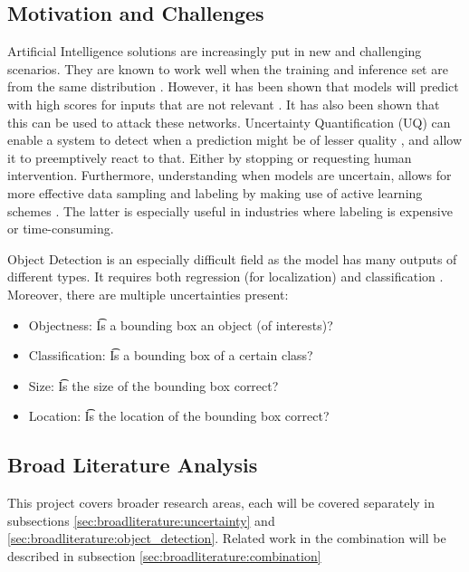 \subsection{Motivation and Challenges}

Artificial Intelligence solutions are increasingly put in new and challenging scenarios. They are known to work well when the training and inference set are from the same distribution \cite{krizhevsky2012imagenet}. However, it has been shown that models will predict with high scores for inputs that are not relevant \cite{Nguyen_2015_CVPR,szegedy2013intriguing}. It has also been shown that this can be used to attack these networks\cite{goodfellow2014explaining,dong2018boosting}.
Uncertainty Quantification (UQ) can enable a system to detect when a prediction might be of lesser quality \cite{däubener2020detecting}, and allow it to preemptively react to that\cite{osti_1481629}. Either by stopping or requesting human intervention.
Furthermore, understanding when models are uncertain, allows for more effective data sampling and labeling by making use of active learning schemes \cite{settles2009active,Bernhardt_2022,yang2009effective}. The latter is especially useful in industries where labeling is expensive or time-consuming.

Object Detection is an especially difficult field as the model has many outputs of different types. It requires both regression (for localization) and classification \cite{Gasperini_2022}. Moreover, there are multiple uncertainties present:
\begin{itemize}
    \item Objectness: \t Is a bounding box an object (of interests)?
    \item Classification: \t Is a bounding box of a certain class?
    \item Size: \t Is the size of the bounding box correct?
    \item Location: \t Is the location of the bounding box correct?
\end{itemize}


\subsection{Broad Literature Analysis}\label{sec:broadliterature}

This project covers broader research areas, each will be covered separately in subsections \ref{sec:broadliterature:uncertainty} and \ref{sec:broadliterature:object_detection}. Related work in the combination will be described in subsection \ref{sec:broadliterature:combination}

